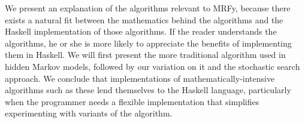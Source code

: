 \documentclass[preprint,nonatbib,blockstyle,nocopyrightspace,times]{sigplanconf}
\begin{document}
We present an explanation of the algorithms relevant to MRFy, because there 
exists a natural fit between the mathematics behind the algorithms and the 
Haskell implementation of those algorithms.
If the reader understands the 
algorithms, he or she is more likely to appreciate the benefits of implementing 
them in Haskell.
We will first present the more traditional algorithm used in 
hidden Markov models, followed by our variation on it and the stochastic search 
approach.
We conclude that implementations of mathematically-intensive 
algorithms such as these lend themselves to the Haskell language, particularly 
when the programmer needs a flexible implementation that simplifies 
experimenting with variants of the algorithm.



% 
\end{document}
